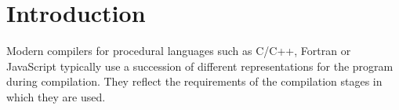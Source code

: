 

\section{Introduction}

    Modern compilers for procedural languages such as
    C/C++, Fortran or JavaScript typically use a succession of different
    representations for the program during compilation.
    They reflect the requirements of the compilation stages in which they are
    used.

